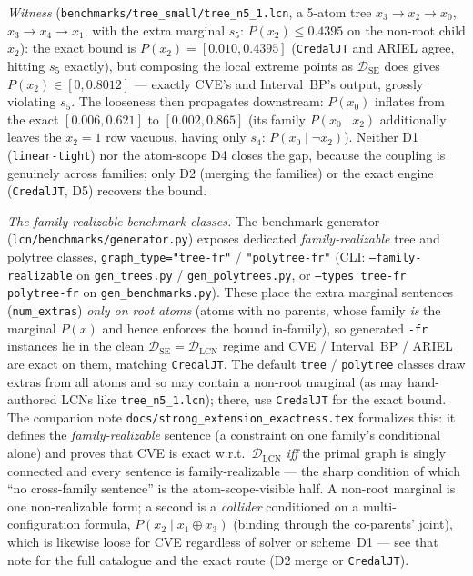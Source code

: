 \documentclass[11pt]{article}
\newcommand{\DSE}{\mathcal{D}_{\mathrm{SE}}}
\newcommand{\DLCN}{\mathcal{D}_{\mathrm{LCN}}}
\begin{document}
\emph{Witness} (\texttt{benchmarks/tree\_small/tree\_n5\_1.lcn}, a 5-atom tree
$x_3\!\to\!x_2\!\to\!x_0$, $x_3\!\to\!x_4\!\to\!x_1$, with the extra marginal $s_5:\,P(x_2)\le
0.4395$ on the non-root child $x_2$): the exact bound is $P(x_2)=[0.010,0.4395]$ (\texttt{CredalJT}
and ARIEL agree, hitting $s_5$ exactly), but composing the local extreme points as $\DSE$ does gives
$P(x_2)\in[0,0.8012]$ --- exactly CVE's and Interval~BP's output, grossly violating $s_5$. The
looseness then propagates downstream: $P(x_0)$ inflates from the exact $[0.006,0.621]$ to
$[0.002,0.865]$ (its family $P(x_0\mid x_2)$ additionally leaves the $x_2{=}1$ row vacuous, having
only $s_4:\,P(x_0\mid\lnot x_2)$). Neither D1 (\texttt{linear-tight}) nor the atom-scope D4 closes the
gap, because the coupling is genuinely across families; only D2 (merging the families) or the exact
engine (\texttt{CredalJT}, D5) recovers the bound.

\emph{The family-realizable benchmark classes.} The benchmark generator
(\texttt{lcn/benchmarks/generator.py}) exposes dedicated \emph{family-realizable} tree and polytree
classes, \texttt{graph\_type="tree-fr"} / \texttt{"polytree-fr"} (CLI: \texttt{--family-realizable}
on \texttt{gen\_trees.py} / \texttt{gen\_polytrees.py}, or \texttt{--types tree-fr polytree-fr} on
\texttt{gen\_benchmarks.py}). These place the extra marginal sentences (\texttt{num\_extras})
\emph{only on root atoms} (atoms with no parents, whose family \emph{is} the marginal $P(x)$ and hence
enforces the bound in-family), so generated \texttt{-fr} instances lie in the clean $\DSE=\DLCN$
regime and CVE / Interval~BP / ARIEL are exact on them, matching \texttt{CredalJT}. The default
\texttt{tree} / \texttt{polytree} classes draw extras from all atoms and so may contain a non-root
marginal (as may hand-authored LCNs like \texttt{tree\_n5\_1.lcn}); there, use \texttt{CredalJT} for
the exact bound. The companion
note \texttt{docs/strong\_extension\_exactness.tex} formalizes this: it defines the
\emph{family-realizable} sentence (a constraint on one family's conditional alone) and proves that
CVE is exact w.r.t.\ $\DLCN$ \emph{iff} the primal graph is singly connected and every sentence is
family-realizable --- the sharp condition of which ``no cross-family sentence'' is the
atom-scope-visible half. A non-root marginal is one non-realizable form; a second is a
\emph{collider} conditioned on a multi-configuration formula, $P(x_2\mid x_1\oplus x_3)$ (binding
through the co-parents' joint), which is likewise loose for CVE regardless of solver or scheme~D1 ---
see that note for the full catalogue and the exact route (D2 merge or \texttt{CredalJT}).
\end{document}
